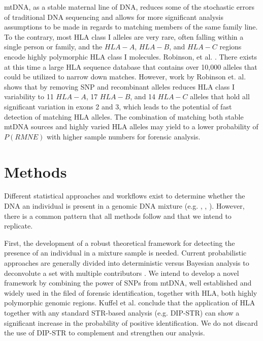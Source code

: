 \documentclass[10pt]{article}
\begin{document}
mtDNA, as a stable maternal line of DNA, reduces some of the stochastic errors of traditional DNA sequencing and allows for more significant analysis assumptions to be made in regards to matching members of the same family line. To the contrary, most HLA class I alleles are very rare, often falling within a single person or family, and the $HLA-A$, $HLA-B$, and $HLA-C$ regions encode highly polymorphic HLA class I molecules. Robinson, et al. \cite{Robinson2017}.  There exists at this time a large HLA sequence database that contains over 10,000 alleles that could be utilized to narrow down matches.  However, work by Robinson et. al. shows that by removing SNP and recombinant alleles reduces HLA class I variability to 11 $HLA-A$, 17 $HLA-B$, and 14 $HLA-C$ alleles that hold all significant variation in exons 2 and 3, which leads to the potential of fast detection of matching HLA alleles.  The combination of matching both stable mtDNA sources and highly varied HLA alleles may yield to a lower probability of $P(RMNE)$ with higher sample numbers for forensic analysis.



\section{Methods}

Different statistical approaches and workflows exist to determine whether the DNA an individual is present in a genomic DNA mixture (e.g. \cite{Cowell2015}, \cite{Homer2008}, \cite{Vohr2015}). However, there is a common pattern that all methods follow and that we intend to replicate. 

First, the development of a robust theoretical framework for detecting the presence of an individual in a mixture sample is needed. Current probabilistic approaches are generally divided into deterministic versus Bayesian analysis to deconvolute a set with multiple contributors \cite{Hu2014}. We intend to develop a novel framework by combining the power of SNPs from mtDNA, well established and widely used in the filed of forensic identification, together with HLA, both highly polymorphic genomic regions. Kuffel et al. \cite{Kuffel2019} conclude that the application of HLA together with any standard STR-based analysis (e.g. DIP-STR) can show a significant increase in the probability of positive identification. We do not discard the use of DIP-STR to complement and strengthen our analysis.
\end{document}

